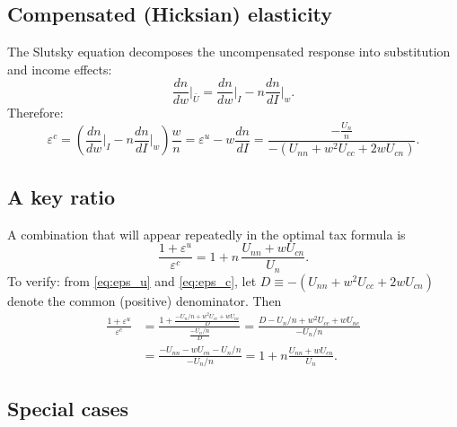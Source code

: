 \documentclass[12pt,a4paper]{article}
\theoremstyle{definition}
\theoremstyle{plain}
\theoremstyle{remark}
\begin{document}
\subsection{Compensated (Hicksian) elasticity}

The Slutsky equation decomposes the uncompensated response into substitution and income effects:
\[
  \frac{dn}{dw}\bigg|_{\bar U} = \frac{dn}{dw}\bigg|_I - n \frac{dn}{dI}\bigg|_w.
\]
Therefore:
\begin{equation}
\label{eq:eps_c}
  \varepsilon^c = \left( \frac{dn}{dw}\bigg|_I - n \frac{dn}{dI}\bigg|_w \right) \frac{w}{n}
  = \varepsilon^u - w \frac{dn}{dI}
  = \frac{-\tfrac{U_n}{n}}{-(U_{nn} + w^2 U_{cc} + 2w U_{cn})}.
\end{equation}

\subsection{A key ratio}

A combination that will appear repeatedly in the optimal tax formula is
\begin{equation}
\label{eq:key_ratio}
  \frac{1 + \varepsilon^u}{\varepsilon^c}
  = 1 + n \, \frac{U_{nn} + w U_{cn}}{U_n}.
\end{equation}
To verify: from \eqref{eq:eps_u} and \eqref{eq:eps_c}, let $D \equiv -(U_{nn} + w^2 U_{cc} + 2w U_{cn})$ denote the common (positive) denominator. Then
\begin{align*}
  \frac{1 + \varepsilon^u}{\varepsilon^c}
  &= \frac{1 + \frac{-U_n/n + w^2 U_{cc} + w U_{nc}}{D}}
       {\frac{-U_n/n}{D}}
  = \frac{D - U_n/n + w^2 U_{cc} + w U_{nc}}{-U_n/n} \\[6pt]
  &= \frac{-U_{nn} - w U_{cn} - U_n/n}{-U_n/n}
  = 1 + n \frac{U_{nn} + w U_{cn}}{U_n}.
\end{align*}

\subsection{Special cases}
\label{sec:elasticity_cases}
\end{document}
